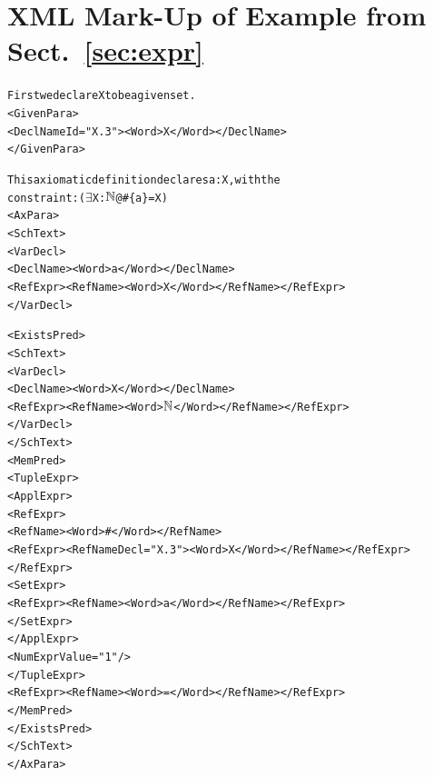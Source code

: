 \documentclass{llncs}  %
\begin{document}
\section{XML Mark-Up of Example from Sect.~\ref{sec:expr}}
\newcommand{\NAT}{$\nat$}
\newcommand{\EXISTS}{$\exists$}
\begin{small}
\begin{alltt}
  First we declare X to be a given set. 
  <GivenPara>
    <DeclName Id="X.3"> <Word>X</Word> </DeclName>
  </GivenPara>

  This axiomatic definition declares a:X, with the
  constraint: (\EXISTS X:\NAT @ #\{a\} = X)
  <AxPara>
    <SchText>
      <VarDecl>
        <DeclName> <Word>a</Word> </DeclName>
        <RefExpr> <RefName> <Word>X</Word> </RefName> </RefExpr>
      </VarDecl>

      <ExistsPred>
        <SchText>
          <VarDecl>
            <DeclName> <Word>X</Word> </DeclName>
            <RefExpr> <RefName> <Word>\NAT</Word> </RefName> </RefExpr>
          </VarDecl>
        </SchText>
        <MemPred>
          <TupleExpr>
            <ApplExpr>
              <RefExpr>
                <RefName><Word>#</Word></RefName>
                <RefExpr> <RefName Decl="X.3"> <Word>X</Word> </RefName> </RefExpr>
              </RefExpr>
              <SetExpr>
                <RefExpr><RefName><Word>a</Word></RefName></RefExpr>
              </SetExpr>
            </ApplExpr>
            <NumExpr Value="1"/>
          </TupleExpr>
          <RefExpr><RefName><Word>=</Word></RefName></RefExpr>
        </MemPred>
      </ExistsPred>
    </SchText>
  </AxPara>
\end{alltt}
\end{small}
\end{document}
